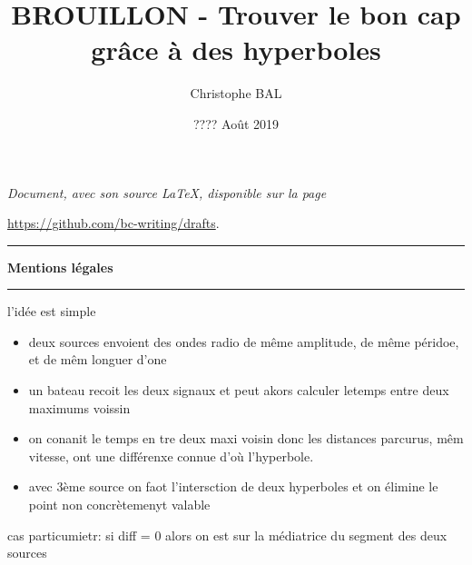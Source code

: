 \documentclass[12pt]{amsart}
\begin{document}
\title{BROUILLON - Trouver le bon cap grâce à des hyperboles}
\author{Christophe BAL}
\date{???? Août 2019}
\maketitle


\begin{center}
	\itshape
	Document, avec son source \LaTeX, disponible sur la page
	
	\url{https://github.com/bc-writing/drafts}.
\end{center}


\bigskip


\begin{center}
	\hrule\vspace{.3em}
	{
		\fontsize{1.35em}{1em}\selectfont
		\textbf{Mentions \og légales \fg}
	}
			
	\vspace{0.45em}
	\doclicenseThis
	\hrule
\end{center}



\setcounter{tocdepth}{2}
\tableofcontents



l'idée est simple

\begin{itemize}
	\item deux sources envoient des ondes radio de même amplitude, de même péridoe, et de mêm longuer d'one

	\item un bateau recoit les deux signaux et peut akors calculer letemps entre deux maximums voissin
	
	\item on conanit le temps en tre deux maxi voisin donc les distances parcurus, mêm vitesse, ont une différenxe connue d'où l'hyperbole.
	
	\item avec 3ème source on faot l'intersction de deux hyperboles et on élimine le point non concrètemenyt valable
\end{itemize}
	
	
cas particumietr: si diff = 0 alors on est sur la médiatrice du segment des deux sources

\newpage

%
%
\end{document}
